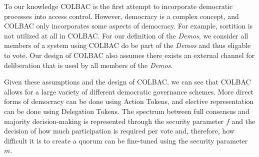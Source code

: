 To our knowledge COLBAC is the first attempt to incorporate democratic processes
into access control. However, democracy is a complex concept, and COLBAC only
incorporates some aspects of democracy. For example, sortition is not utilized
at all in COLBAC. For our definition of the \textit{Demos}, we consider all members of
a system using COLBAC do be part of the \textit{Demos} and thus eligable to vote. Our
design of COLBAC also assumes there exists an external channel for deliberation
that is used by all members of the \textit{Demos}.

Given these assumptions and the design of COLBAC, we can see that COLBAC allows
for a large variety of different democratic governance schemes. More direct
forms of democracy can be done using Action Tokens, and elective representation
can be done using Delegation Tokens. The spectrum between full consensus and
majority decision-making is represented through the security parameter $f$ and
the decision of how much participation is required per vote and, therefore, how
difficult it is to create a quorum can be fine-tuned using the security
parameter $m$.
